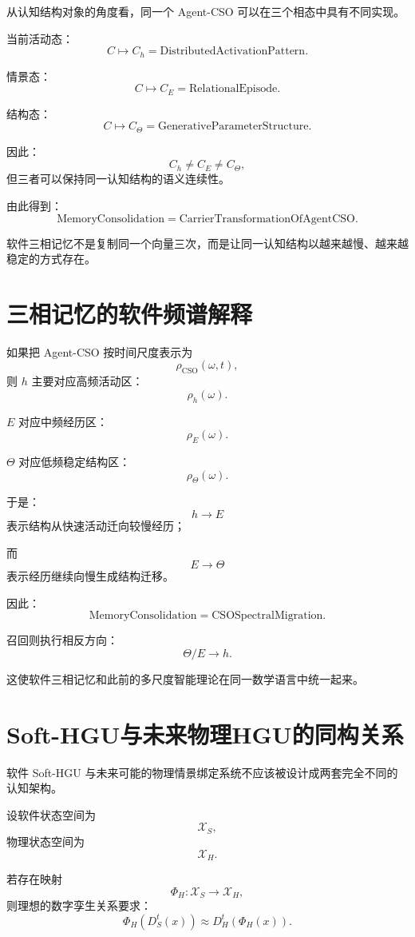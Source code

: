 从认知结构对象的角度看，同一个 Agent-CSO 可以在三个相态中具有不同实现。

当前活动态：
\[
C
\mapsto
C_h
=
\mathrm{DistributedActivationPattern}.
\]

情景态：
\[
C
\mapsto
C_E
=
\mathrm{RelationalEpisode}.
\]

结构态：
\[
C
\mapsto
C_\Theta
=
\mathrm{GenerativeParameterStructure}.
\]

因此：
\[
\boxed{
C_h
\neq
C_E
\neq
C_\Theta,
}
\]
但三者可以保持同一认知结构的语义连续性。

由此得到：
\[
\boxed{
\mathrm{MemoryConsolidation}
=
\mathrm{CarrierTransformationOfAgentCSO}.
}
\]

软件三相记忆不是复制同一个向量三次，而是让同一认知结构以越来越慢、越来越稳定的方式存在。

\section{三相记忆的软件频谱解释}

如果把 Agent-CSO 按时间尺度表示为
\[
\rho_{\mathrm{CSO}}(\omega,t),
\]
则 $h$ 主要对应高频活动区：
\[
\rho_h(\omega).
\]

$E$ 对应中频经历区：
\[
\rho_E(\omega).
\]

$\Theta$ 对应低频稳定结构区：
\[
\rho_\Theta(\omega).
\]

于是：
\[
h\rightarrow E
\]
表示结构从快速活动迁向较慢经历；

而
\[
E\rightarrow\Theta
\]
表示经历继续向慢生成结构迁移。

因此：
\[
\boxed{
\mathrm{MemoryConsolidation}
=
\mathrm{CSOSpectralMigration}.
}
\]

召回则执行相反方向：
\[
\Theta/E
\rightarrow
h.
\]

这使软件三相记忆和此前的多尺度智能理论在同一数学语言中统一起来。

\section{Soft-HGU与未来物理HGU的同构关系}

软件 Soft-HGU 与未来可能的物理情景绑定系统不应该被设计成两套完全不同的认知架构。

设软件状态空间为
\[
\mathcal X_S,
\]
物理状态空间为
\[
\mathcal X_H.
\]

若存在映射
\[
\Phi_H:
\mathcal X_S
\rightarrow
\mathcal X_H,
\]
则理想的数字孪生关系要求：
\[
\boxed{
\Phi_H
\left(
D_S^t(x)
\right)
\approx
D_H^t
\left(
\Phi_H(x)
\right).
}
\]

